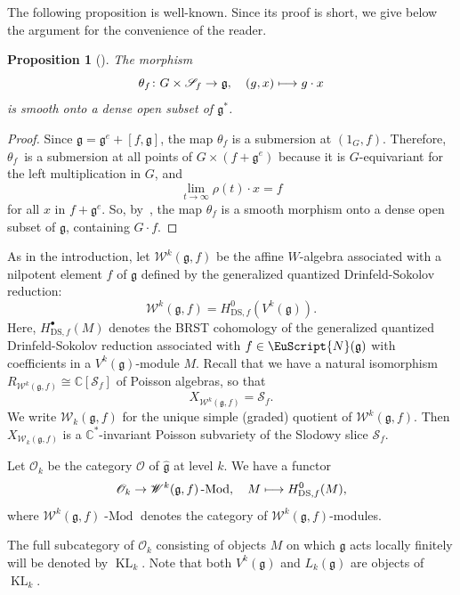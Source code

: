 \documentclass[JEP,XML,SOM,Unicode]{cedram}
\newcommand{\sbullet}{{\scriptscriptstyle\bullet}}
\newcommand\mto{\mathchoice{\longmapsto}{\mapsto}{\mapsto}{\mapsto}}
\newcommand{\DS}{\mathrm{DS}}
\let\mathcal \EuScript
\let\on\operatorname
\newcommand\C{{\mathbb C}}
\newcommand \g{\mathfrak g}
\newcommand \frg{\widehat{\mathfrak{g}}}
\newcommand \W{\mathscr{W}}
\newtheorem{prop}[theorem]{Proposition}
\theoremstyle{definition}
\begin{document}
The following proposition is well-known.
Since its proof is short, we give below
the argument for the convenience of the reader.

\begin{prop}[{\cite{Slo80,Premet02,Charbonnel-Moreau}}]
\label{pro:Slodowy}
The morphism
\[
\theta_f \colon G \times \mathscr{S}_f \to \g,
\quad (g,x) \mto g\cdot x
\]
is smooth onto a dense open subset of $\g^*$.
\end{prop}
\begin{proof}
Since $\g =\g^{e}+[f,\g]$, the map $\theta_f$ is a submersion at
$(1_{G},f)$. Therefore, $\theta _{f}$~is a submersion at all points of
$G\times (f +\g^{e})$ because it is $G$-equivariant for the left
multiplication in $G$, and
\[
\lim _{t \to \infty } \rho(t)\cdot x = f
\]
for all $x$ in $f+\g^{e}$. So, by~\cite[Ch.\,III, Prop.\,10.4]{Hartshorne},
the map $\theta _{f}$ is a smooth morphism onto a dense open subset of
$\g$, containing $G\cdot f$.
\end{proof}

As in the introduction, let $\W^k(\g,f)$ be the {affine $W$-algebra} associated with
a nilpotent element $f$ of $\g$
defined by the generalized quantized Drinfeld-Sokolov reduction:
\[
\W^k(\g,f)=H^{0}_{\DS,f}(V^k(\g)).
\]
Here, $H^{\sbullet}_{\DS,f}(M)$ denotes the BRST
cohomology of the generalized quantized Drinfeld-Sokolov reduction
associated with $f \in \mathcal{N}(\g)$ with coefficients in
a $V^k(\g)$-module $M$.
Recall that we have \cite{DSK06,Ara09b} a natural isomorphism
$R_{\W^k(\g,f)}\cong \C[\mathscr{S}_{f}]$ of Poisson algebras, so that
\begin{equation*}
X_{\W^k(\g,f)}= \mathscr{S}_{f}.
\end{equation*}
We write $\W_k(\g,f)$ for the unique simple (graded) quotient of
$\W^k(\g,f)$. Then $X_{\W_k(\g,f)}$
is a $\C^*$-invariant Poisson
subvariety of the Slodowy slice $\mathscr{S}_f$.

Let $\mathscr{O}_k$ be the category $\mathscr{O}$ of
$\frg$ at level $k$.
We have a functor
\begin{equation*}
\mathscr{O}_k\to\W^k(\g,f)\on{-Mod},\quad M\mto
H^0_{\DS,f}(M),
\end{equation*}
where
$\W^k(\g,f)\on{-Mod}$ denotes the category
of $\W^k(\g,f)$-modules.

The full subcategory of $\mathscr{O}_k$ consisting of
objects $M$ on which $\g$ acts locally finitely will be denoted by $\on{KL}_k$.
Note that both $V^k(\g)$ and $L_k(\g)$ are objects of $\on{KL}_k$.
\end{document}

